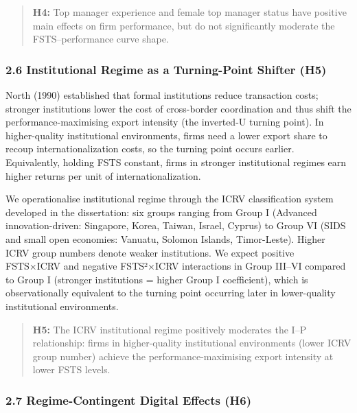 \documentclass[12pt,a4paper]{article}
\begin{document}
\begin{quote}
\textbf{H4:} Top manager experience and female top manager status have
positive main effects on firm performance, but do not significantly
moderate the FSTS--performance curve shape.
\end{quote}

\hypertarget{26-institutional-regime-as-a-turning-point-shifter-h5}{%
\subsubsection{2.6 Institutional Regime as a Turning-Point Shifter
(H5)}\label{26-institutional-regime-as-a-turning-point-shifter-h5}}

North (1990) established that formal institutions reduce transaction
costs; stronger institutions lower the cost of cross-border coordination
and thus shift the performance-maximising export intensity (the
inverted-U turning point). In higher-quality institutional environments,
firms need a lower export share to recoup internationalization costs, so
the turning point occurs earlier. Equivalently, holding FSTS constant,
firms in stronger institutional regimes earn higher returns per unit of
internationalization.

We operationalise institutional regime through the ICRV classification
system developed in the dissertation: six groups ranging from Group I
(Advanced innovation-driven: Singapore, Korea, Taiwan, Israel, Cyprus)
to Group VI (SIDS and small open economies: Vanuatu, Solomon Islands,
Timor-Leste). Higher ICRV group numbers denote weaker institutions. We
expect positive FSTS×ICRV and negative FSTS²×ICRV interactions in Group
III--VI compared to Group I (stronger institutions = higher Group I
coefficient), which is observationally equivalent to the turning point
occurring later in lower-quality institutional environments.

\begin{quote}
\textbf{H5:} The ICRV institutional regime positively moderates the I--P
relationship: firms in higher-quality institutional environments (lower
ICRV group number) achieve the performance-maximising export intensity
at lower FSTS levels.
\end{quote}

\hypertarget{27-regime-contingent-digital-effects-h6}{%
\subsubsection{2.7 Regime-Contingent Digital Effects
(H6)}\label{27-regime-contingent-digital-effects-h6}}
\end{document}
